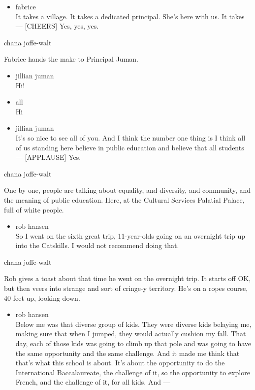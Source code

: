 \begin{itemize}
\tightlist
\item
  fabrice\\
  It takes a village. It takes a dedicated principal. She's here with
  us. It takes --- {[}CHEERS{]} Yes, yes, yes.
\end{itemize}

chana joffe-walt

Fabrice hands the make to Principal Juman.

\begin{itemize}
\item
  jillian juman\\
  Hi!
\item
  all\\
  Hi
\item
  jillian juman\\
  It's so nice to see all of you. And I think the number one thing is I
  think all of us standing here believe in public education and believe
  that all students --- {[}APPLAUSE{]} Yes.
\end{itemize}

chana joffe-walt

One by one, people are talking about equality, and diversity, and
community, and the meaning of public education. Here, at the Cultural
Services Palatial Palace, full of white people.

\begin{itemize}
\tightlist
\item
  rob hansen\\
  So I went on the sixth great trip, 11-year-olds going on an overnight
  trip up into the Catskills. I would not recommend doing that.
\end{itemize}

chana joffe-walt

Rob gives a toast about that time he went on the overnight trip. It
starts off OK, but then veers into strange and sort of cringe-y
territory. He's on a ropes course, 40 feet up, looking down.

\begin{itemize}
\tightlist
\item
  rob hansen\\
  Below me was that diverse group of kids. They were diverse kids
  belaying me, making sure that when I jumped, they would actually
  cushion my fall. That day, each of those kids was going to climb up
  that pole and was going to have the same opportunity and the same
  challenge. And it made me think that that's what this school is about.
  It's about the opportunity to do the International Baccalaureate, the
  challenge of it, so the opportunity to explore French, and the
  challenge of it, for all kids. And ---
\end{itemize}

